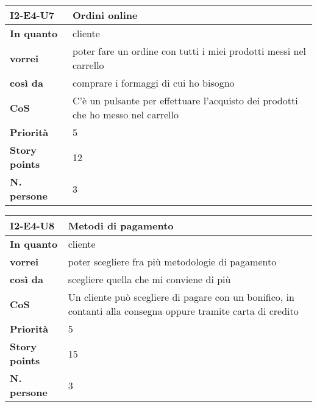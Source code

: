\begin{table}[H]
  \begin{tabularx}{\textwidth}{lX}
    \toprule
    \textbf{I2-E4-U7} & \textbf{Ordini online} \\
    \midrule
    \textbf{In quanto} & cliente \\
    \textbf{vorrei} & poter fare un ordine con tutti i miei prodotti messi nel carrello \\
    \textbf{così da} & comprare i formaggi di cui ho bisogno \\
    \midrule
    \textbf{CoS} & C'è un pulsante per effettuare l'acquisto dei prodotti che ho messo nel carrello \\
    \midrule
    \textbf{Priorità} & 5 \\
    \textbf{Story points} & 12 \\
    \textbf{N. persone} & 3 \\
    \bottomrule
  \end{tabularx}
  \label{user-story:i2-e4-u7}
\end{table}

\begin{table}[H]
  \begin{tabularx}{\textwidth}{lX}
    \toprule
    \textbf{I2-E4-U8} & \textbf{Metodi di pagamento} \\
    \midrule
    \textbf{In quanto} & cliente \\
    \textbf{vorrei} & poter scegliere fra più metodologie di pagamento \\
    \textbf{così da} & scegliere quella che mi conviene di più \\
    \midrule
    \textbf{CoS} & Un cliente può scegliere di pagare con un bonifico, in contanti alla consegna oppure tramite carta di credito \\
    \midrule
    \textbf{Priorità} & 5 \\
    \textbf{Story points} & 15 \\
    \textbf{N. persone} & 3 \\
    \bottomrule
  \end{tabularx}
  \label{user-story:i2-e4-u8}
\end{table}

